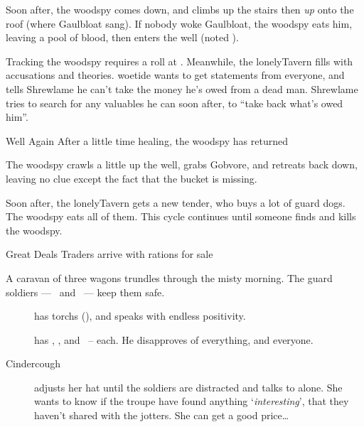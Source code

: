 \documentclass[10pt,twoside]{book}
\begin{document}
\setcounter{wounds}{3}
\woodspy

Soon after, the \gls{woodspy} comes down, and climbs up the stairs then \emph{up} onto the roof (where Gaulbloat sang).
If nobody woke Gaulbloat, the \gls{woodspy} eats him, leaving a pool of blood, then enters the well (noted ).

Tracking the \gls{woodspy} requires a  roll at \tn[10].
Meanwhile, the \gls{lonelyTavern} fills with accusations and theories.
\Gls{woetide} wants to get statements from everyone, and tells Shrewlame he can't take the money he's owed from a dead man.
Shrewlame tries to search for any valuables he can soon after, to ``take back what's owed him''.

{Well Again}%
{After a little time healing, the \gls{woodspy} has returned}%

The \gls{woodspy} crawls a little up the well, grabs Gobvore, and retreats back down, leaving no clue except the fact that the bucket is missing.

Soon after, the \gls{lonelyTavern} gets a new \gls{tender}, who buys a lot of guard dogs.
The \gls{woodspy} eats all of them.
This cycle continues until someone finds and kills the \gls{woodspy}.


{Great Deals}%
{Traders arrive with \glspl{ration} for sale}%

A caravan of three wagons trundles through the misty morning.
The \gls{guard} \glspl{soldier} --- \composeHumanName\ and \composeHumanName\ --- keep them safe.

\begin{description}
  \item[\composeHumanName]
  has \glspl{torch} (), and speaks with endless positivity.
  \item[\composeHumanName]
  has \rations, \rations, and \rations\ --  each.
  He disapproves of everything, and everyone.
  \item[Cindercough]
  adjusts her hat until the \glspl{soldier} are distracted and talks to  alone.
  She wants to know if the troupe have found anything `\emph{interesting}', that they haven't shared with the \glspl{jotter}.
  She can get a good price\ldots
\end{description}
\end{document}
